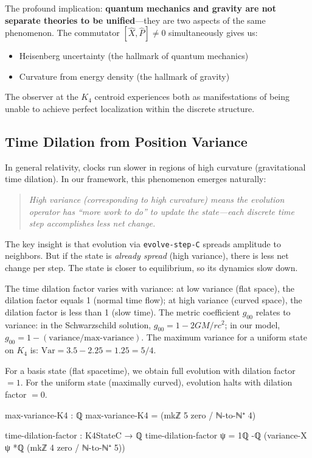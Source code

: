 \documentclass[11pt,a4paper]{book}
\begin{document}
The profound implication: \textbf{quantum mechanics and gravity are not 
separate theories to be unified}---they are two aspects of the same 
phenomenon. The commutator $[\hat{X},\hat{P}] \neq 0$ simultaneously gives us:
\begin{itemize}
\item Heisenberg uncertainty (the hallmark of quantum mechanics)
\item Curvature from energy density (the hallmark of gravity)
\end{itemize}

The observer at the $K_4$ centroid experiences both as manifestations of
being unable to achieve perfect localization within the discrete structure.

\subsection{Time Dilation from Position Variance}

In general relativity, clocks run slower in regions of high curvature 
(gravitational time dilation). In our framework, this phenomenon emerges naturally:
\begin{quote}
\emph{High variance (corresponding to high curvature) means the evolution operator has ``more work to do''
to update the state---each discrete time step accomplishes less net change.}
\end{quote}

The key insight is that evolution via \texttt{evolve-step-C} spreads amplitude to neighbors.
But if the state is \emph{already spread} (high variance), there is less net change
per step. The state is closer to equilibrium, so its dynamics slow down.

The time dilation factor varies with variance: at low variance (flat space), the dilation factor equals 1 (normal time flow); at high variance (curved space), the dilation factor is less than 1 (slow time). The metric coefficient $g_{00}$ relates to variance: in the Schwarzschild solution, $g_{00} = 1 - 2GM/rc^2$; in our model, $g_{00} = 1 - (\text{variance}/\text{max-variance})$. The maximum variance for a uniform state on $K_4$ is: $\text{Var} = 3.5 - 2.25 = 1.25 = 5/4$.

For a basis state (flat spacetime), we obtain full evolution with dilation factor $= 1$. For the uniform state (maximally curved), evolution halts with dilation factor $= 0$.

\begin{code}
max-variance-K4 : ℚ
max-variance-K4 = (mkℤ 5 zero / ℕ-to-ℕ⁺ 4)

time-dilation-factor : K4StateC → ℚ
time-dilation-factor ψ = 1ℚ -ℚ (variance-X ψ *ℚ (mkℤ 4 zero / ℕ-to-ℕ⁺ 5))
\end{code}
\end{document}
